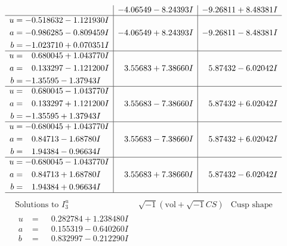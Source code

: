 \documentclass[1p]{elsarticle_modified}
\theoremstyle{definition}
\newcommand{\I}{\sqrt{-1}}
\begin{document}
$$\begin{array}{c|c|c}
 & -4.06549 - 8.24393 I & -9.26811 + 8.48381 I \\ \hline\begin{aligned}
u &= -0.518632 - 1.121930 I \\
a &= -0.986285 - 0.809459 I \\
b &= -1.023710 + 0.070351 I\end{aligned}
 & -4.06549 + 8.24393 I & -9.26811 - 8.48381 I \\ \hline\begin{aligned}
u &= \phantom{-}0.680045 + 1.043770 I \\
a &= \phantom{-}0.133297 - 1.121200 I \\
b &= -1.35595 - 1.37943 I\end{aligned}
 & \phantom{-}3.55683 + 7.38660 I & \phantom{-}5.87432 - 6.02042 I \\ \hline\begin{aligned}
u &= \phantom{-}0.680045 - 1.043770 I \\
a &= \phantom{-}0.133297 + 1.121200 I \\
b &= -1.35595 + 1.37943 I\end{aligned}
 & \phantom{-}3.55683 - 7.38660 I & \phantom{-}5.87432 + 6.02042 I \\ \hline\begin{aligned}
u &= -0.680045 + 1.043770 I \\
a &= \phantom{-}0.84713 - 1.68780 I \\
b &= \phantom{-}1.94384 - 0.96634 I\end{aligned}
 & \phantom{-}3.55683 - 7.38660 I & \phantom{-}5.87432 + 6.02042 I \\ \hline\begin{aligned}
u &= -0.680045 - 1.043770 I \\
a &= \phantom{-}0.84713 + 1.68780 I \\
b &= \phantom{-}1.94384 + 0.96634 I\end{aligned}
 & \phantom{-}3.55683 + 7.38660 I & \phantom{-}5.87432 - 6.02042 I\\
 \hline 
 \end{array}$$\newpage$$\begin{array}{c|c|c}  
\text{Solutions to }I^u_{3}& \I (\text{vol} + \sqrt{-1}CS) & \text{Cusp shape}\\
 \hline 
\begin{aligned}
u &= \phantom{-}0.282784 + 1.238480 I \\
a &= \phantom{-}0.155319 - 0.640260 I \\
b &= \phantom{-}0.832997 - 0.212290 I\end{aligned}

\end{array}$$
\end{document}
